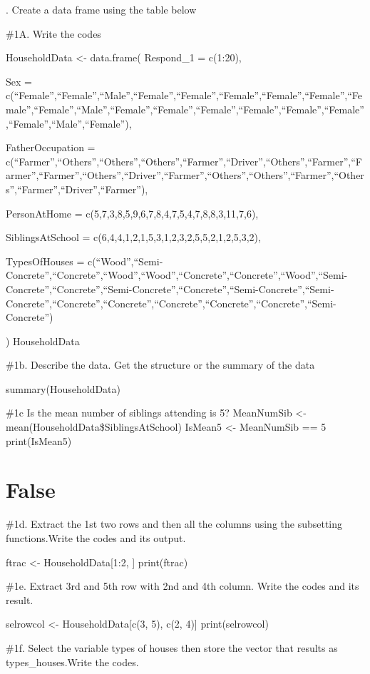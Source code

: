 \documentclass[
]{article}
\author{}
\date{\vspace{-2.5em}}
\begin{document}
. Create a data frame using the table below

\#1A. Write the codes

HouseholdData \textless- data.frame( Respond\_1 = c(1:20),

Sex =
c(``Female'',``Female'',``Male'',``Female'',``Female'',``Female'',``Female'',``Female'',``Female'',``Female'',``Male'',``Female'',``Female'',``Female'',``Female'',``Female'',``Female'',``Female'',``Male'',``Female''),

FatherOccupation =
c(``Farmer'',``Others'',``Others'',``Others'',``Farmer'',``Driver'',``Others'',``Farmer'',``Farmer'',``Farmer'',``Others'',``Driver'',``Farmer'',``Others'',``Others'',``Farmer'',``Others'',``Farmer'',``Driver'',``Farmer''),

PersonAtHome = c(5,7,3,8,5,9,6,7,8,4,7,5,4,7,8,8,3,11,7,6),

SiblingsAtSchool = c(6,4,4,1,2,1,5,3,1,2,3,2,5,5,2,1,2,5,3,2),

TypesOfHouses =
c(``Wood'',``Semi-Concrete'',``Concrete'',``Wood'',``Wood'',``Concrete'',``Concrete'',``Wood'',``Semi-Concrete'',``Concrete'',``Semi-Concrete'',``Concrete'',``Semi-Concrete'',``Semi-Concrete'',``Concrete'',``Concrete'',``Concrete'',``Concrete'',``Concrete'',``Semi-Concrete'')

) HouseholdData

\#1b. Describe the data. Get the structure or the summary of the data

summary(HouseholdData)

\#1c Is the mean number of siblings attending is 5? MeanNumSib
\textless- mean(HouseholdData\$SiblingsAtSchool) IsMean5 \textless-
MeanNumSib == 5 print(IsMean5)

\hypertarget{false}{%
\section{False}\label{false}}

\#1d. Extract the 1st two rows and then all the columns using the
subsetting functions.Write the codes and its output.

ftrac \textless- HouseholdData{[}1:2, {]} print(ftrac)

\#1e. Extract 3rd and 5th row with 2nd and 4th column. Write the codes
and its result.

selrowcol \textless- HouseholdData{[}c(3, 5), c(2, 4){]}
print(selrowcol)

\#1f. Select the variable types of houses then store the vector that
results as types\_houses.Write the codes.
\end{document}
